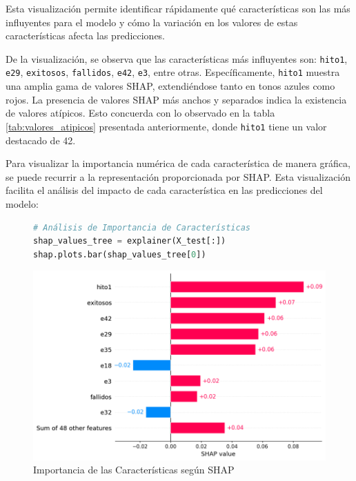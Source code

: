 Esta visualización permite identificar rápidamente qué características son las más influyentes para el modelo y cómo la variación en los valores de estas características afecta las predicciones.

De la visualización, se observa que las características más influyentes son: \texttt{hito1}, \texttt{e29}, \texttt{exitosos}, \texttt{fallidos}, \texttt{e42}, \texttt{e3}, entre otras. Específicamente, \texttt{hito1} muestra una amplia gama de valores SHAP, extendiéndose tanto en tonos azules como rojos. La presencia de valores SHAP más anchos y separados indica la existencia de valores atípicos. Esto concuerda con lo observado en la tabla \ref{tab:valores_atipicos} presentada anteriormente, donde \texttt{hito1} tiene un valor destacado de 42.

Para visualizar la importancia numérica de cada característica de manera gráfica, se puede recurrir a la representación proporcionada por SHAP. Esta visualización facilita el análisis del impacto de cada característica en las predicciones del modelo:

\begin{figure}[ht]
    \centering
    \begin{minipage}{0.48\textwidth}
        \begin{lstlisting}[language=Python, caption=Análisis de Importancia de Características, label=lst:cod_calvaloreshap]
# Análisis de Importancia de Características
shap_values_tree = explainer(X_test[:])
shap.plots.bar(shap_values_tree[0])
        \end{lstlisting}
    \end{minipage}
    \hfill
    \begin{minipage}{0.48\textwidth}
        \centering
        \includegraphics[width=0.9\linewidth]{img/shap_rf/ImportanciaDeCaracteristicasShap.png}
        \caption{Importancia de las Características según SHAP}
        \label{fig:importancia_relativa_shap}
    \end{minipage}
\end{figure}

